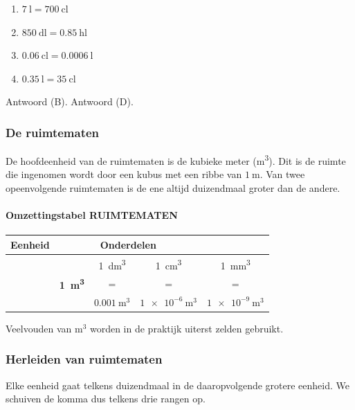 \documentclass{bis}
\begin{document}
\begin{solution}
\begin{enumerate}
  \item \(\SI{7}{\litre}=\SI{700}{\centi\litre}\)
  \item \(\SI{850}{\deci\litre}=\SI{0.85}{\hecto\litre}\)
  \item \(\SI{0.06}{\centi\litre}=\SI{0.0006}{\litre}\)
  \item \(\SI{0.35}{\litre}=\SI{35}{\centi\litre}\)
\end{enumerate}
Antwoord (B).\quad \; Antwoord (D).
\end{solution}

\subsubsection{De ruimtematen}
De hoofdeenheid van de ruimtematen is de kubieke meter (\si{\cubic\metre}). Dit is de ruimte die ingenomen wordt door een kubus met een ribbe van \(\SI{1}{\metre}\). Van twee opeenvolgende ruimtematen is de ene altijd duizendmaal groter dan de andere.

\paragraph{Omzettingstabel RUIMTEMATEN}
\begin{center}
\renewcommand{\arraystretch}{1.2}\setlength{\tabcolsep}{4pt}%
\begin{tabular}{*{5}{c}}
  \textbf{Eenheid} & \multicolumn{3}{c}{\textbf{Onderdelen}}\\
  \midrule
& & \SI{1}{\cubic\deci\metre} & \SI{1}{\cubic\centi\metre} & \SI{1}{\cubic\milli\metre}\\
& \textbf{\SI{1}{\cubic\metre}} & = & = & =\\
& & \(\SI{0.001}{\cubic\metre}\) & \(\SI{1e-6}{\cubic\metre}\) & \(\SI{1e-9}{\cubic\metre}\)
\end{tabular}
\end{center}

Veelvouden van \(\si{\cubic\metre}\) worden in de praktijk uiterst zelden gebruikt.

\subsubsection{Herleiden van ruimtematen}
Elke eenheid gaat telkens duizendmaal in de daaropvolgende grotere eenheid. We schuiven de komma dus telkens drie rangen op.
\end{document}
